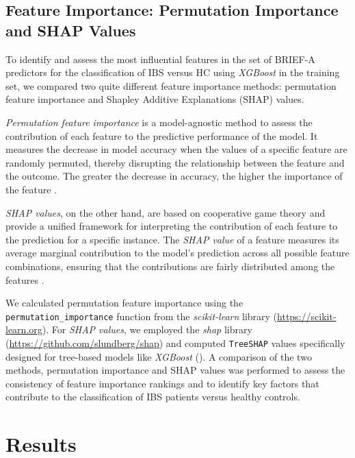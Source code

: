 \documentclass[jcm,article,submit,pdftex,moreauthors]{Definitions/mdpi}
\begin{document}
\subsection{Feature Importance: Permutation Importance and SHAP Values}

To identify and assess the most influential features in the set of BRIEF-A predictors for the classification of IBS versus HC using \textit{XGBoost} in the training set, we compared two quite different feature importance methods: permutation feature importance and Shapley Additive Explanations (SHAP) values.

\textit{Permutation feature importance} is a model-agnostic method to assess the contribution of each feature to the predictive performance of the model. It measures the decrease in model accuracy when the values of a specific feature are randomly permuted, thereby disrupting the relationship between the feature and the outcome. The greater the decrease in accuracy, the higher the importance of the feature \cite{breiman2001random}.

\textit{SHAP values}, on the other hand, are based on cooperative game theory and provide a unified framework for interpreting the contribution of each feature to the prediction for a specific instance. The \textit{SHAP value} of a feature measures its average marginal contribution to the model's prediction across all possible feature combinations, ensuring that the contributions are fairly distributed among the features \cite{lundberg2020local}.

We calculated permutation feature importance using the \texttt{permutation\_importance} function from the \textit{scikit-learn} library ({\small \url{https://scikit-learn.org}}). For \textit{SHAP values}, we employed the \textit{shap} library ({\small  \url{https://github.com/slundberg/shap}}) and computed \texttt{TreeSHAP} values specifically designed for tree-based models like \textit{XGBoost} (\cite{lundberg2020local}). A comparison of the two methods, permutation importance and SHAP values was performed to assess the consistency of feature importance rankings and to identify key factors that contribute to the classification of IBS patients versus healthy controls.




\section{Results}
\end{document}

